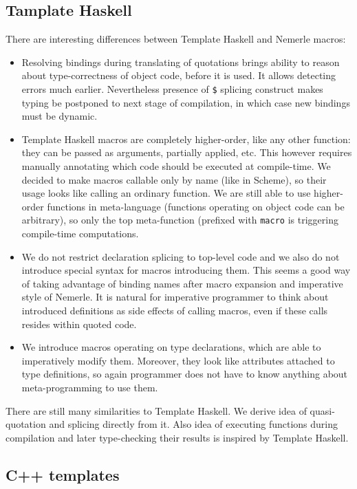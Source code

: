 \documentclass{llncs}
\begin{document}
\subsection{Tamplate Haskell}
There are interesting differences between Template Haskell \cite{Haskell:Meta} and Nemerle macros:
\begin{itemize}
\item Resolving bindings during translating of quotations brings ability to reason
  about type-correctness of object code, before it is used. It allows detecting
  errors much earlier. Nevertheless presence of \verb,$, splicing construct makes %
  typing be postponed to next stage of compilation, in which case new bindings 
  must be dynamic.
\item Template Haskell macros are completely higher-order, like any other 
  function: they can be passed as arguments, partially applied, etc. This
  however requires manually annotating which code should be executed at 
  compile-time. We decided to make macros callable only by name (like in Scheme), 
  so their usage looks like calling an ordinary function. We are still able to use 
  higher-order functions in meta-language (functions operating on object code can 
  be arbitrary), so only the top meta-function (prefixed with \verb,macro, is 
  triggering compile-time computations.
\item We do not restrict declaration splicing to top-level code and we also do not
  introduce special syntax for macros introducing them. This seems a good way of
  taking advantage of binding names after macro expansion and imperative style
  of Nemerle. It is natural for imperative programmer to think about introduced 
  definitions as side effects of calling macros, even if these calls resides within
  quoted code.
\item We introduce macros operating on type declarations, which are able to imperatively
  modify them. Moreover, they look like attributes attached to type definitions, so
  again programmer does not have to know anything about meta-programming to use them.
\end{itemize}

There are still many similarities to Template Haskell. We derive idea of quasi-quotation
and splicing directly from it. Also idea of executing functions during compilation
and later type-checking their results is inspired by Template Haskell.

\subsection{C++ templates}
\end{document}
